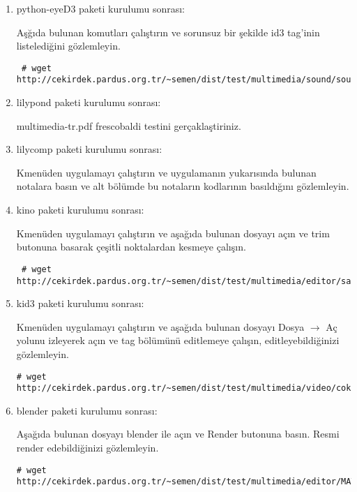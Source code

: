 \documentclass[a4paper,10pt]{article}
\begin{document}
\begin{enumerate}

\item python-eyeD3 paketi kurulumu sonrası:

Aşğıda bulunan komutları çalıştırın ve sorunsuz bir şekilde id3 tag'inin listelediğini gözlemleyin.
\begin{verbatim}
 # wget http://cekirdek.pardus.org.tr/~semen/dist/test/multimedia/sound/sound/linux.mp3
\end{verbatim}


\item lilypond paketi kurulumu sonrası:

  multimedia-tr.pdf frescobaldi testini gerçaklaştiriniz.

\item lilycomp paketi kurulumu sonrası:
   
 Kmenüden uygulamayı çalıştırın ve uygulamanın yukarısında bulunan notalara basın ve alt bölümde bu notaların kodlarının basıldığını gözlemleyin.

\item kino paketi kurulumu sonrası:

  Kmenüden uygulamayı çalıştırın ve aşağıda bulunan dosyayı açın ve trim butonuna basarak çeşitli noktalardan kesmeye çalışın.
\begin{verbatim}
 # wget http://cekirdek.pardus.org.tr/~semen/dist/test/multimedia/editor/sample.dv
\end{verbatim}


\item kid3 paketi kurulumu sonrası:

Kmenüden uygulamayı çalıştırın ve aşağıda bulunan dosyayı Dosya $\rightarrow$ Aç yolunu izleyerek açın ve tag bölümünü editlemeye çalışın, editleyebildiğinizi gözlemleyin.

\begin{verbatim}
# wget http://cekirdek.pardus.org.tr/~semen/dist/test/multimedia/video/cokluortam/linux.mp3 
\end{verbatim}

 \item blender paketi kurulumu sonrası:

Aşağıda bulunan dosyayı blender ile açın ve Render butonuna basın. Resmi render edebildiğinizi gözlemleyin.
\begin{verbatim}
# wget http://cekirdek.pardus.org.tr/~semen/dist/test/multimedia/editor/MATtests1.blend 
\end{verbatim}


\end{enumerate}
\end{document}
